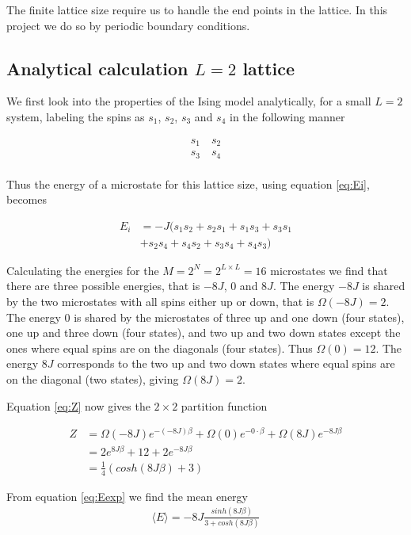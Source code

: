 \documentclass[norsk, 10pt, twocolumn, a4paper]{revtex4}
\begin{document}
The finite lattice size require us to handle the end points in the lattice. In this project we do so by periodic
boundary conditions.

\subsection{Analytical calculation $L=2$ lattice}
We first look into the properties of the Ising model analytically, for a small $L=2$ system, 
labeling the spins as $s_1$, $s_2$, $s_3$ and $s_4$ in the following
manner

\begin{align*}
  s_1 \quad s_2 \\
  s_3 \quad s_4 \\
\end{align*}

Thus the energy of a microstate for this lattice size, using equation \ref{eq:Ei}, becomes

\begin{align}
    E_i & = -J(s_1s_2 + s_2s_1 + s_1s_3 + s_3s_1 \\ 
        &+ s_2s_4 + s_4s_2 + s_3s_4 + s_4s_3)
\end{align}

Calculating the energies for the  $M= 2^N = 2^{L\times L}= 16$ microstates we find that there are three possible energies,
that is $-8J$, $0$ and $8J$. The energy $-8J$ is shared by the two microstates with all spins either up or down,
that is $\Omega(-8J)=2$. The energy $0$ is shared by the microstates of three up and one down (four states),
one up and three down (four states), and two up and two down states except the ones where equal spins are on the
diagonals (four states). Thus $\Omega(0) =12$. The energy $8J$ corresponds to the two up and two down states where
equal spins are on the diagonal (two states), giving $\Omega(8J)=2$.

Equation \ref{eq:Z} now gives the $2\times 2$ partition function

\begin{align*}
    Z & = \Omega(-8J)e^{-(-8J)\beta} + \Omega(0)e^{-0\cdot\beta} + \Omega(8J)e^{-8J\beta} \\
      & = 2e^{8J\beta} + 12 + 2e^{-8J\beta} \\
      & = \frac{1}{4}(cosh(8J\beta) + 3)
\end{align*}


From equation \ref{eq:Eexp} we find the mean energy
\begin{align*}
    \langle E\rangle = -8J \frac{sinh(8J\beta)}{3 + cosh(8J\beta)}
\end{align*}
\end{document}
